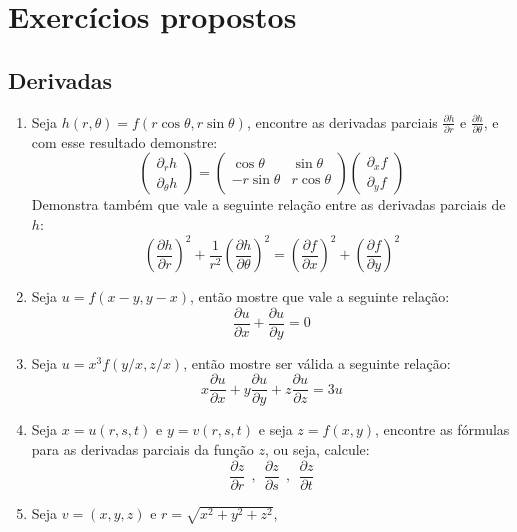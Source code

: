 \section{Exercícios propostos}


\subsection{Derivadas}

\begin{enumerate}
	\item Seja $h(r,\theta) = f(r\cos\theta,r\sin\theta)$, encontre as derivadas parciais $\frac{\partial h}{\partial r}$ e $\frac{\partial h}{\partial \theta}$, e com esse resultado demonstre:
	\[ 
	\left(\begin{array}{c} 
   \partial_{r}h \\ \partial_{\theta}h
   \end{array}\right) = 
   \left(\begin{array}{cc} 
     \cos\theta  &  \sin\theta \\ 
   -r \sin\theta & r\cos\theta \\
   \end{array}\right)
   \left(\begin{array}{c} 
   \partial_{x}f \\ \partial_{y}f
   \end{array}\right)
  \]
  Demonstra também que vale a seguinte relação entre as derivadas 
  parciais de $h$:
  \[
  \left(\frac{\partial h}{\partial r}\right)^2 + \frac{1}{r^2}
  \left(\frac{\partial h}{\partial\theta}\right)^2 
  = \left(\frac{\partial f}{\partial x}\right)^2 
  + \left(\frac{\partial f}{\partial y}\right)^2
  \]
  \item Seja $u = f(x-y,y-x)$, então mostre que vale a seguinte relação:
  \[
  \frac{\partial u}{\partial x} + \frac{\partial u}{\partial y} = 0
  \]
  \item Seja $u = x^3f(y/x,z/x)$, então mostre ser válida a seguinte relação:
  \[
  x \frac{\partial u}{\partial x} 
  + y\frac{\partial u}{\partial y} 
  + z\frac{\partial u}{\partial z} = 3u
  \]
  \item Seja $x = u(r,s,t)$ e $y = v(r,s,t)$ e seja $z = f(x,y)$, encontre as fórmulas para as derivadas parciais da função $z$, ou seja, calcule:
  \[
  \frac{\partial z}{\partial r} 
  \ \ , \ \ 
  \frac{\partial z}{\partial s} 
  \ \ , \ \ 
  \frac{\partial z}{\partial t}
  \]
  \item Seja $v = (x,y,z)$ e $r = \sqrt{x^{2} + y^{2} + z^{2}}$, 

\end{enumerate}
